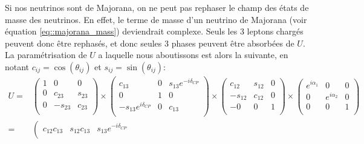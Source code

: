             Si nos neutrinos sont de Majorana, on ne peut pas rephaser le champ des états de masse des neutrinos. En effet, le terme de masse d'un neutrino de Majorana (voir équation \eqref{eq::majorana_mass}) deviendrait complexe. Seuls les 3 leptons chargés peuvent donc être rephasés, et donc seules 3 phases peuvent être absorbées de $U$. La paramétrisation de $U$ a laquelle nous aboutissons est alors la suivante, en notant $c_{ij}=\cos(\theta_{ij})$ et $s_{ij}=\sin(\theta_{ij})$: 
            \begin{eqnarray}
                U= & 
                \left(\begin{matrix}
                        1   &    0    &    0   \\
                        0   & c_{23}  & s_{23} \\
                        0   & -s_{23} & c_{23} \\
                \end{matrix}\right)\times
                \left(\begin{matrix}
                    c_{13}  &    0    & s_{13}e^{-i\delta_{CP}} \\
                        0   &    1    &    0   \\
    -s_{13}e^{i\delta_{CP}} &    0    & c_{13} \\
                \end{matrix}\right)\times
                \left(\begin{matrix}
                    c_{12}  & s_{12}  &    0   \\
                    -s_{12} & c_{12}  &    0   \\
   -                    0   &    0    &    1   \\
                \end{matrix}\right)\times
                \left(\begin{matrix}
              e^{i\alpha_1} &    0    &    0   \\
                        0   & e^{i\alpha_2} & 0 \\
                        0   & 0 & 1 \\
                \end{matrix}\right) \\\label{eq::pmns}
                =& 
                \left(\begin{matrix}
c_{12}c_{13}                                    & s_{12}c_{13}                                    & s_{13}e^{-i\delta_{CP}} \\

\end{matrix}
\end{eqnarray}
